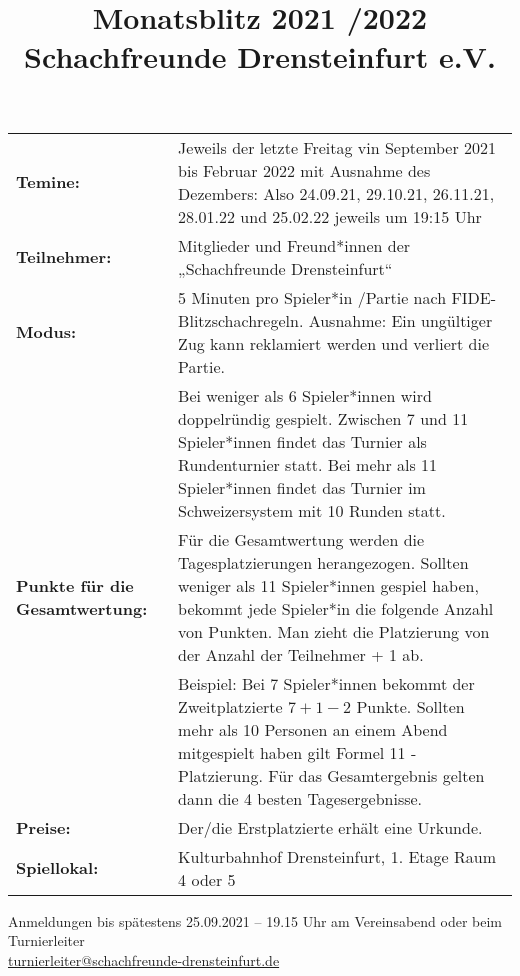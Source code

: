 \documentclass[a4paper,parskip=full-,DIV15]{scrartcl}
\title{Monatsblitz 2021 /2022 \\Schachfreunde Drensteinfurt e.V.}
\date{}
\begin{document}
\maketitle


\begin{tabular}{p{4.0 cm} p{12.5 cm}}
	\textbf{Temine:}     & Jeweils der letzte Freitag vin September 2021 bis Februar 2022 mit Ausnahme des Dezembers: Also 24.09.21, 29.10.21, 26.11.21, 28.01.22  und 25.02.22 jeweils um 19:15 Uhr  \\
	\textbf{Teilnehmer:} & Mitglieder und Freund*innen der „Schachfreunde Drensteinfurt“\\
	\textbf{Modus:}      & 5 Minuten pro Spieler*in /Partie nach FIDE-Blitzschachregeln. Ausnahme: Ein ungültiger Zug kann reklamiert werden und verliert die Partie.  \\
	                     &Bei weniger als 6 Spieler*innen wird doppelründig gespielt. Zwischen 7  und 11 Spieler*innen findet das Turnier als Rundenturnier statt. Bei mehr als 11 Spieler*innen findet das Turnier im Schweizersystem mit 10 Runden statt. \\
   \textbf{Punkte für die Gesamtwertung:}     & Für die Gesamtwertung werden die Tagesplatzierungen herangezogen. Sollten weniger als 11 Spieler*innen gespiel haben, bekommt jede Spieler*in die folgende Anzahl von Punkten. Man zieht die Platzierung von der Anzahl der Teilnehmer + 1 ab.\\
   & Beispiel: Bei 7 Spieler*innen bekommt der Zweitplatzierte $ 7 + 1 -2 $ Punkte. Sollten mehr als 10 Personen an einem Abend mitgespielt haben gilt Formel 11 - Platzierung. Für das Gesamtergebnis gelten dann die 4 besten Tagesergebnisse. \\
	\textbf{Preise:}     & Der/die Erstplatzierte erhält eine Urkunde.\\
	\textbf{Spiellokal:} & Kulturbahnhof Drensteinfurt, 1. Etage Raum 4 oder 5\\
\end{tabular}


\bigskip

Anmeldungen bis spätestens 25.09.2021 – 19.15 Uhr am Vereinsabend oder beim Turnierleiter \\ \href{mailto:turnierleiter@schachfreunde-drensteinfurt.de}{turnierleiter@schachfreunde-drensteinfurt.de}
\end{document}

